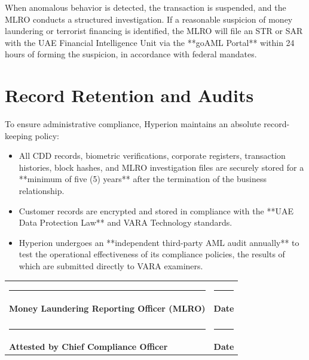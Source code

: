 \documentclass[11pt]{article}
\begin{document}
When anomalous behavior is detected, the transaction is suspended, and the MLRO conducts a structured investigation. If a reasonable suspicion of money laundering or terrorist financing is identified, the MLRO will file an STR or SAR with the UAE Financial Intelligence Unit via the **goAML Portal** within 24 hours of forming the suspicion, in accordance with federal mandates.

\section{Record Retention and Audits}
To ensure administrative compliance, Hyperion maintains an absolute record-keeping policy:
\begin{itemize}
    \item All CDD records, biometric verifications, corporate registers, transaction histories, block hashes, and MLRO investigation files are securely stored for a **minimum of five (5) years** after the termination of the business relationship.
    \item Customer records are encrypted and stored in compliance with the **UAE Data Protection Law** and VARA Technology standards.
    \item Hyperion undergoes an **independent third-party AML audit annually** to test the operational effectiveness of its compliance policies, the results of which are submitted directly to VARA examiners.
\end{itemize}

\par\vspace{1.5cm}
\noindent
\begin{tabularx}{\textwidth}{X X}
    \rule{4cm}{0.4pt} & \rule{4cm}{0.4pt} \\
    \textbf{Money Laundering Reporting Officer (MLRO)} & \textbf{Date} \\
    & \\
    \rule{4cm}{0.4pt} & \rule{4cm}{0.4pt} \\
    \textbf{Attested by Chief Compliance Officer} & \textbf{Date}
\end{tabularx}

\makehyperionseal
\end{document}
